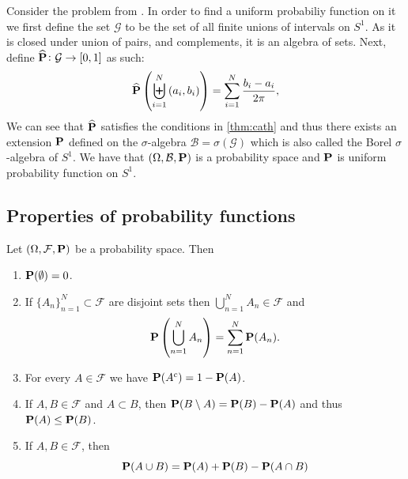 \documentclass[11pt,a4paper]{article}
\begin{document}
\begin{remark}
  Consider the problem from .
  In order to find a uniform probabiliy function on it we first define the
  set $\mathcal G$ to be the set of all finite unions of intervals on $S^1$.
  As it is closed under union of pairs, and complements, it is an algebra of sets.
  Next, define $\widehat{\mathbf{P}} \colon \mathcal G \to [0,1]$ as such:
  \[
    \widehat{\Prob} \del{\biguplus_{i=1}^{N} \del{a_i,b_i}} =
    \sum_{i=1}^{N} \frac{b_i - a_i}{2\pi},
  \]
  We can see that $\widehat{\mathbf{P}}$ satisfies the conditions in 
  \autoref{thm:cath} and thus there exists an extension $\mathbf{P}$ defined on
  the $\sigma$-algebra $\mathcal B = \sigma(\mathcal G)$ which is also called
  the Borel $\sigma$-algebra of $S^1$. We have that 
  $(\Omega, \mathcal B, \mathbf{P})$ is a probability space and
  $\mathbf{P}$ is uniform probability function on $S^1$.
\end{remark}

\subsection{Properties of probability functions}
\begin{proposition}
  Let $(\Omega, \mathcal F, \mathbf{P})$ be a probability space.
  Then
  \begin{enumerate}
    \item[(1)] $\mathbf{P}(\emptyset) = 0$.
    \item[(2)] If $\{A_n\}_{n=1}^{N} \subset \mathcal F$ are disjoint sets then
      $\bigcup_{n=1}^{N}{A_n} \in \mathcal F$ and
      \[
        \mathbf{P}\left(\bigcup_{n=1}^{N}{A_n}\right) = 
        \sum_{n=1}^{N}{\mathbf{P}(A_n)}.
      \]
    \item[(3)] For every $A \in \mathcal F$ we have 
      $\mathbf{P}(A^c) = 1 - \mathbf{P}(A)$.
    \item[(4)] If $A, B \in \mathcal F$ and $A \subset B$, then 
      $\mathbf{P}(B \setminus A) = \mathbf{P}(B) - \mathbf{P}(A)$ and thus
      $\mathbf{P}(A) \le \mathbf{P}(B)$.
    \item[(5)] If $A,B \in \mathcal F$, then
      \[
        \mathbf{P}(A \cup B) = 
        \mathbf{P}(A) + \mathbf{P}(B) - \mathbf{P}(A \cap B)
      \]
  \end{enumerate}
\end{proposition}
\end{document}

